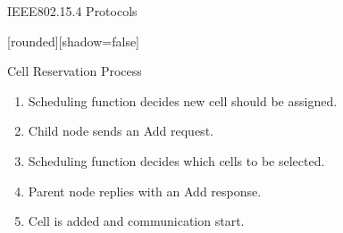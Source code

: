 \begin{withoutheadline}
\begin{frame}{IEEE802.15.4 Protocols}


[rounded][shadow=false]
\begin{block}{Cell Reservation Process}
    \begin{enumerate}
    
    
    \item  Scheduling function decides new cell should be assigned.
    \item<2-> Child node sends an Add request. 
    \item<3-> Scheduling function decides which cells to be selected. 
    \item<4-> Parent node replies with an Add response.
    \item<5-> Cell is added and communication start.
    \end{enumerate}
    \end{block}

\begin{figure}[p]


\end{figure}
\end{frame}
\end{withoutheadline}
